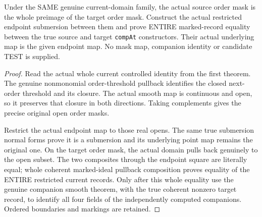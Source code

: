 \begin{theorem}
\label{hir:original-untested-modeled-whole-companion-smooth-mask}
\leanok
Under the SAME genuine current-domain family, the actual source order
mask is the whole preimage of the target order mask. Construct the
actual restricted endpoint submersion between them and prove ENTIRE
marked-record equality between the true source and target
\texttt{compAt} constructors. Their actual underlying map is the given
endpoint map. No mask map, companion identity or candidate TEST is
supplied.
\end{theorem}
\begin{proof}
Read the actual whole current controlled identity from the first
theorem. The genuine nonmonomial order-threshold pullback identifies
the closed next-order threshold and its closure. The actual smooth map
is continuous and open, so it preserves that closure in both
directions. Taking complements gives the precise original open order
masks.

Restrict the actual endpoint map to those real opens. The same true
submersion normal forms prove it is a submersion and its underlying
point map remains the original one. On the target order mask, the
actual domain pulls back genuinely to the open subset. The two
composites through the endpoint square are literally equal; whole
coherent marked-ideal pullback composition proves equality of the
ENTIRE restricted current records. Only after this whole equality use
the genuine companion smooth theorem, with the true coherent
nonzero target record, to identify all four fields of the independently
computed companions. Ordered boundaries and markings are retained.
\end{proof}


